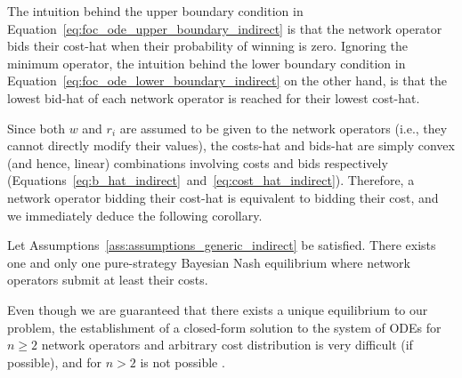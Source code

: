 The intuition behind the upper boundary condition in Equation~\eqref{eq:foc_ode_upper_boundary_indirect} is that the network operator bids their cost-hat when their probability of winning is zero. Ignoring the minimum operator, the intuition behind the lower boundary condition in Equation~\eqref{eq:foc_ode_lower_boundary_indirect} on the other hand, is that the lowest bid-hat of each network operator is reached for their lowest cost-hat.

Since both $w$ and $r_i$ are assumed to be given to the network operators (i.e., they cannot directly modify their values), the costs-hat and bids-hat are simply convex (and hence, linear) combinations involving costs and bids respectively (Equations~\eqref{eq:b_hat_indirect}~and~\eqref{eq:cost_hat_indirect}). Therefore, a network operator bidding their cost-hat is equivalent to bidding their cost, and we immediately deduce the following corollary.
\begin{corollary}
\label{cor:characterization_of_the_equilibrium_indirect}
Let Assumptions~\ref{ass:assumptions_generic_indirect} be satisfied. There exists one and only one pure-strategy Bayesian Nash equilibrium where network operators submit at least their costs.
\end{corollary}

Even though we are guaranteed that there exists a unique equilibrium to our problem, the establishment of a closed-form solution to the system of ODEs for $n\ge 2$ network operators and arbitrary cost distribution is very difficult (if possible), and for $n>2$ is not possible \cite{Lebrun2006, Krishna10}.

